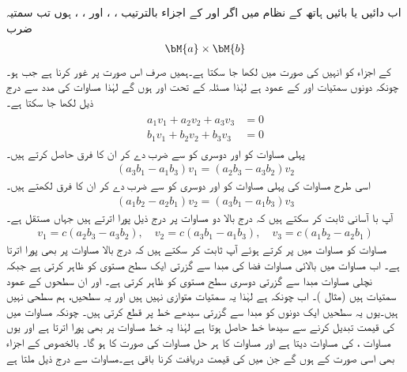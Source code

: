 اب دائیں یا بائیں ہاتھ کے نظام میں اگر  اور  کے اجزاء بالترتیب ، ،  اور ، ،  ہوں تب سمتیہ ضرب 
\begin{align*}
\bM{a}\times \bM{b}
\end{align*}
کے اجزاء کو انہیں کی صورت میں لکھا جا سکتا ہے۔ہمیں صرف اس صورت پر غور کرنا ہے جب  ہو۔چونکہ  دونوں سمتیات  اور  کے عمود ہے لہٰذا مسئلہ  کے تحت  اور  ہوں گے لہٰذا مساوات  کی مدد سے درج ذیل لکھا جا سکتا ہے۔
\begin{gather}
\begin{aligned}\label{مساوات_الجبرا_سمتی_ضرب_اجزاء_کی_صورت_الف}
a_1v_1+a_2v_2+a_3v_3&=0\\
b_1v_1+b_2v_2+b_3v_3&=0
\end{aligned}
\end{gather}
پہلی مساوات کو  اور دوسری کو  سے ضرب دے کر ان کا فرق حاصل کرتے ہیں۔
\begin{align*}
(a_3b_1-a_1b_3)v_1=(a_2b_3-a_3b_2)v_2
\end{align*}
اسی طرح مساوات  کی پہلی مساوات کو  اور دوسری کو  سے ضرب دے کر ان کا فرق  لکھتے ہیں۔ 
\begin{align*}
(a_1b_2-a_2b_1)v_2=(a_3b_1-a_1b_3)v_3
\end{align*}
آپ با آسانی ثابت کر سکتے ہیں کہ درج بالا دو مساوات پر درج ذیل  پورا اترتے ہیں جہاں  مستقل ہے۔
\begin{align}\label{مساوات_الجبرا_سمتی_ضرب_اجزاء_کی_صورت_ب}
v_1=c(a_2b_3-a_3b_2),\quad v_2=c(a_3b_1-a_1b_3),\quad v_3=c(a_1b_2-a_2b_1)
\end{align}
مساوات  کو مساوات  میں پر کرتے ہوئے آپ ثابت کر سکتے ہیں کہ  درج بالا مساوات  پر بھی پورا اترتا ہے۔ اب مساوات  میں بالائی  مساوات   فضا کی مبدا سے گزرتی ایک سطح مستوی کو ظاہر کرتی ہے جبکہ نچلی مساوات مبدا سے گزرتی دوسری سطح مستوی کو ظاہر کرتی ہے۔ اور  ان سطحوں کے عمود سمتیات ہیں (مثال )۔ اب چونکہ  ہے لہٰذا یہ سمتیات متوازی نہیں ہیں اور یہ سطحیں، ہم سطحی نہیں ہیں۔یوں یہ سطحیں  ایک دونوں کو مبدا سے گزرتی سیدھے خط  پر قطع کرتی ہیں۔ چونکہ مساوات  میں  کی قیمت تبدیل کرنے سے سیدھا خط حاصل ہوتا ہے لہٰذا  یہ خط مساوات  پر بھی پورا اترتا ہے  اور یوں مساوات ،  کی مساوات دیتا ہے اور مساوات  کا ہر حل مساوات  کی صورت کا ہو گا۔ بالخصوص  کے اجزاء بھی اسی صورت کے ہوں گے جن میں  کی قیمت دریافت کرنا باقی ہے۔مساوات  سے درج ذیل ملتا ہے
